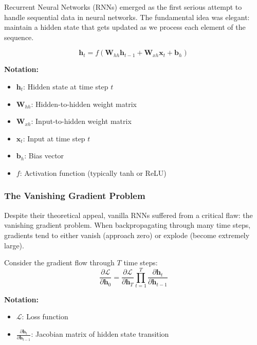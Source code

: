 Recurrent Neural Networks (RNNs) emerged as the first serious attempt to handle sequential data in neural networks. The fundamental idea was elegant: maintain a hidden state that gets updated as we process each element of the sequence.

\begin{equation}
\mathbf{h}_t = f(\mathbf{W}_{hh}\mathbf{h}_{t-1} + \mathbf{W}_{xh}\mathbf{x}_t + \mathbf{b}_h)
\end{equation}
\begin{notationbox}
\textbf{Notation:}
\begin{itemize}
    \item $\mathbf{h}_t$: Hidden state at time step $t$
    \item $\mathbf{W}_{hh}$: Hidden-to-hidden weight matrix
    \item $\mathbf{W}_{xh}$: Input-to-hidden weight matrix
    \item $\mathbf{x}_t$: Input at time step $t$
    \item $\mathbf{b}_h$: Bias vector
    \item $f$: Activation function (typically tanh or ReLU)
\end{itemize}
\end{notationbox}

\subsubsection{The Vanishing Gradient Problem}

Despite their theoretical appeal, vanilla RNNs suffered from a critical flaw: the vanishing gradient problem. When backpropagating through many time steps, gradients tend to either vanish (approach zero) or explode (become extremely large).

Consider the gradient flow through $T$ time steps:
\begin{equation}
\frac{\partial \mathcal{L}}{\partial \mathbf{h}_0} = \frac{\partial \mathcal{L}}{\partial \mathbf{h}_T} \prod_{t=1}^{T} \frac{\partial \mathbf{h}_t}{\partial \mathbf{h}_{t-1}}
\end{equation}
\begin{notationbox}
\textbf{Notation:}
\begin{itemize}
    \item $\mathcal{L}$: Loss function
    \item $\frac{\partial \mathbf{h}_t}{\partial \mathbf{h}_{t-1}}$: Jacobian matrix of hidden state transition
\end{itemize}
\end{notationbox}

